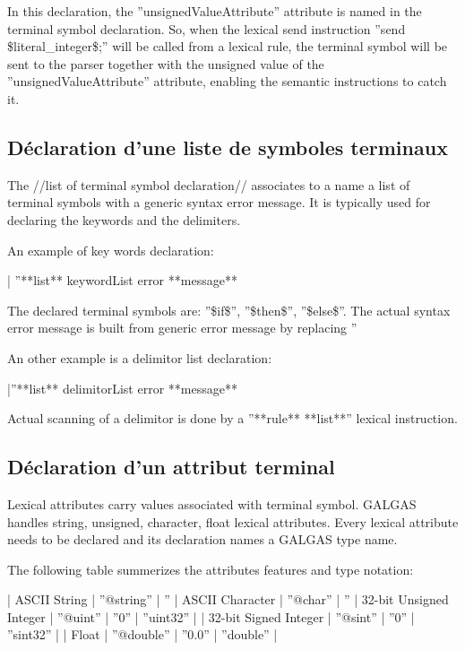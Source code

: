 In this declaration, the ''unsignedValueAttribute'' attribute is named in the terminal symbol declaration. So, when the lexical send instruction ''send \$literal\_integer\$;'' will be called from a lexical rule, the terminal symbol will be sent to the parser together with the unsigned value of the ''unsignedValueAttribute'' attribute, enabling the semantic instructions to catch it.

\subsection{Déclaration d'une liste de symboles terminaux}

The //list of terminal symbol declaration// associates to a name a list of terminal symbols with a generic syntax error message. It is typically used for declaring the keywords and the delimiters.

An example of key words declaration:

| ''**list** keywordList error **message** %

The declared terminal symbols are: ''\$if\$'', ''\$then\$'', ''\$else\$''. The actual syntax error message is built from generic error message by replacing ''%

An other example is a delimitor list declaration:

|''**list** delimitorList error **message** %

Actual scanning of a delimitor is done by a ''**rule** **list**'' lexical instruction.

\subsection{Déclaration d'un attribut terminal}

Lexical attributes carry values associated with terminal symbol. GALGAS handles string, unsigned, character, float lexical attributes. Every lexical attribute needs to be declared and its declaration names a GALGAS type name.


 The following table summerizes the attributes features and type notation:

| ASCII String | ''@string'' | ''%
| ASCII Character | ''@char'' | ''%
| 32-bit Unsigned Integer | ''@uint'' | ''0'' | ''uint32'' |
| 32-bit Signed Integer | ''@sint'' | ''0'' | ''sint32'' |
| Float | ''@double'' | ''0.0'' | ''double'' |

